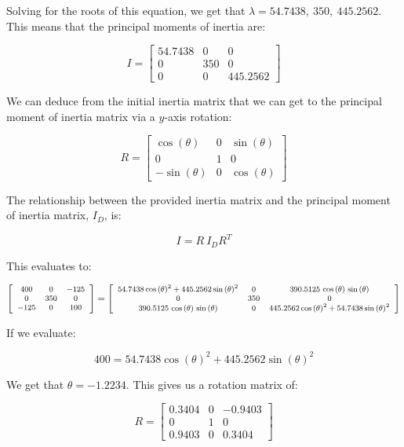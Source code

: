 \documentclass[12pt, letterpaper]{../assignment}
\begin{document}
Solving for the roots of this equation, we get that $\lambda =  54.7438,\ 350,\ 445.2562$. 
This means that the principal moments of inertia are:

\begin{answer}
$$ I = \left[\begin{array}{ccc} 54.7438 & 0 & 0\\ 0 & 350 & 0\\ 0 & 0 & 445.2562 \end{array}\right] $$
\end{answer}

We can deduce from the initial inertia matrix that we can get to the principal moment of inertia matrix via a $y$-axis rotation:

$$ R = \left[\begin{array}{ccc} \cos\left(\theta \right) & 0 & \sin\left(\theta \right)\\ 0 & 1 & 0\\ -\sin\left(\theta \right) & 0 & \cos\left(\theta \right) \end{array}\right] $$

The relationship between the provided inertia matrix and the principal moment of inertia matrix, $I_D$, is:

$$ I = R\ I_D R^T $$

This evaluates to:

$$ \footnotesize \left[\begin{array}{ccc} 400 & 0 & -125\\ 0 & 350 & 0\\ -125 & 0 & 100 \end{array}\right]
= \left[\begin{array}{ccc} 54.7438\,{\cos\left(\theta \right)}^2+445.2562\,{\sin\left(\theta \right)}^2 & 0 & 390.5125\,\cos\left(\theta \right)\,\sin\left(\theta \right)\\ 0 & 350 & 0\\ 390.5125\,\cos\left(\theta \right)\,\sin\left(\theta \right) & 0 & 445.2562\,{\cos\left(\theta \right)}^2+54.7438\,{\sin\left(\theta \right)}^2 \end{array}\right] $$

If we evaluate:

$$ 400 = 54.7438 \cos(\theta)^2 + 445.2562 \sin(\theta)^2 $$

We get that $\theta = -1.2234 $.
This gives us a rotation matrix of:

\begin{answer}
$$ R = \left[\begin{array}{ccc} 0.3404 & 0 & -0.9403\\ 0 & 1 & 0\\ 0.9403 & 0 & 0.3404 \end{array}\right] $$
\end{answer}
\end{document}
